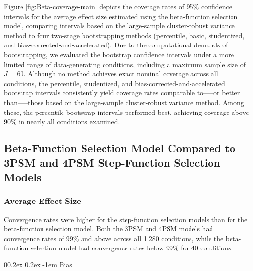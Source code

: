 \documentclass[
  american,
  man, donotrepeattitle,floatsintext]{apa7}
\makeatletter
\let\oldparagraph\paragraph
\renewcommand{\paragraph}{
    \@ifstar
      \xxxParagraphStar
      \xxxParagraphNoStar
  }
\newcommand{\xxxParagraphStar}[1]{\oldparagraph*{#1}\mbox{}}
\newcommand{\xxxParagraphNoStar}[1]{\oldparagraph{#1}\mbox{}}
\renewcommand{\paragraph}{\@startsection{paragraph}{4}{\parindent}%
  {0\baselineskip \@plus 0.2ex \@minus 0.2ex}%
  {-1em}%
  {\normalfont\normalsize\bfseries\itshape\typesectitle}}
\makeatother
\begin{document}
Figure \ref{fig:Beta-coverage-main} depicts the coverage rates of 95\% confidence intervals for the average effect size estimated using the beta-function selection model, comparing intervals based on the large-sample cluster-robust variance method to four two-stage bootstrapping methods (percentile, basic, studentized, and bias-corrected-and-accelerated). Due to the computational demands of bootstrapping, we evaluated the bootstrap confidence intervals under a more limited range of data-generating conditions, including a maximum sample size of \(J = 60\). Although no method achieves exact nominal coverage across all conditions, the percentile, studentized, and bias-corrected-and-accelerated bootstrap intervals consistently yield coverage rates comparable to-----or better than-----those based on the large-sample cluster-robust variance method. Among these, the percentile bootstrap intervals performed best, achieving coverage above 90\% in nearly all conditions examined.

\subsection{Beta-Function Selection Model Compared to 3PSM and 4PSM Step-Function Selection Models}\label{beta-function-selection-model-compared-to-3psm-and-4psm-step-function-selection-models}

\subsubsection{Average Effect Size}\label{average-effect-size-1}

Convergence rates were higher for the step-function selection models than for the beta-function selection model. Both the 3PSM and 4PSM models had convergence rates of 99\% and above across all 1,280 conditions, while the beta-function selection model had convergence rates below 99\% for 40 conditions.

\paragraph{Bias}\label{bias-1}
\end{document}
